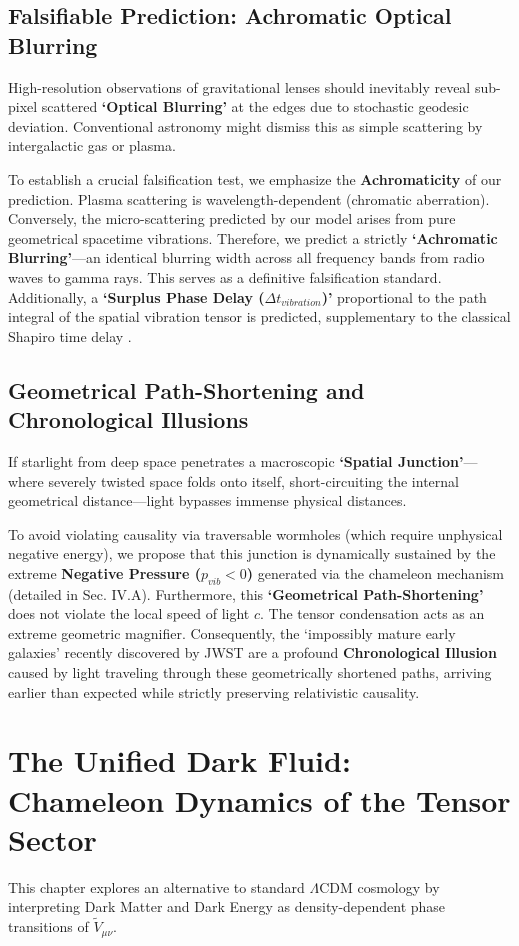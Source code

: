 \documentclass[reprint,amsmath,amssymb,aps,prd]{revtex4-2}
\begin{document}
\subsection{Falsifiable Prediction: Achromatic Optical Blurring}
High-resolution observations of gravitational lenses should inevitably reveal sub-pixel scattered \textbf{`Optical Blurring'} at the edges due to stochastic geodesic deviation. Conventional astronomy might dismiss this as simple scattering by intergalactic gas or plasma. 

To establish a crucial falsification test, we emphasize the \textbf{Achromaticity} of our prediction. Plasma scattering is wavelength-dependent (chromatic aberration). Conversely, the micro-scattering predicted by our model arises from pure geometrical spacetime vibrations. Therefore, we predict a strictly \textbf{`Achromatic Blurring'}---an identical blurring width across all frequency bands from radio waves to gamma rays. This serves as a definitive falsification standard.
Additionally, a \textbf{`Surplus Phase Delay ($\Delta t_{vibration}$)'} proportional to the path integral of the spatial vibration tensor is predicted, supplementary to the classical Shapiro time delay \cite{Shapiro1964}.

\subsection{Geometrical Path-Shortening and Chronological Illusions}
If starlight from deep space penetrates a macroscopic \textbf{`Spatial Junction'}---where severely twisted space folds onto itself, short-circuiting the internal geometrical distance---light bypasses immense physical distances. 

To avoid violating causality via traversable wormholes (which require unphysical negative energy), we propose that this junction is dynamically sustained by the extreme \textbf{Negative Pressure ($p_{vib} < 0$)} generated via the chameleon mechanism (detailed in Sec. IV.A). Furthermore, this \textbf{`Geometrical Path-Shortening'} does not violate the local speed of light $c$. The tensor condensation acts as an extreme geometric magnifier. Consequently, the `impossibly mature early galaxies' recently discovered by JWST are a profound \textbf{Chronological Illusion} caused by light traveling through these geometrically shortened paths, arriving earlier than expected while strictly preserving relativistic causality.

\section{The Unified Dark Fluid: Chameleon Dynamics of the Tensor Sector}
This chapter explores an alternative to standard $\Lambda$CDM cosmology \cite{Riess1998} by interpreting Dark Matter and Dark Energy as density-dependent phase transitions of $\tilde{V}_{\mu\nu}$.
\end{document}
